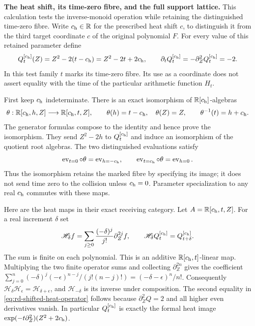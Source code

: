\documentclass[11pt,a4paper]{article}
\theoremstyle{definition}\newtheorem{definition}[theorem]{Definition}
\begin{document}
\RD\textbf{The heat shift, its time-zero fibre, and the full support lattice.}
This calculation tests the inverse-monoid operation while retaining
the distinguished time-zero fibre. Write $c_{\rm h}\in\mathbb R$
for the prescribed heat shift $c$, to distinguish it from the third
target coordinate $c$ of the original polynomial $F$. For every
value of this retained parameter define
\begin{equation}
 Q_t^{[c_{\rm h}]}(Z)=Z^2-2(t-c_{\rm h})
 =Z^2-2t+2c_{\rm h},\qquad
 \partial_tQ_t^{[c_{\rm h}]}=-\partial_Z^2Q_t^{[c_{\rm h}]}=-2.
 \label{eq:rd-shifted-heat}
\end{equation}
In this test family $t$ marks its time-zero fibre. Its use as a
coordinate does not assert equality with the time of the particular
arithmetic function $H_t$.

First keep $c_{\rm h}$ indeterminate. There is an exact isomorphism
of $\mathbb R[c_{\rm h}]$-algebras
\begin{equation}
 \theta:\mathbb R[c_{\rm h},h,Z]\longrightarrow
              \mathbb R[c_{\rm h},t,Z],\qquad
 \theta(h)=t-c_{\rm h},\quad\theta(Z)=Z,
 \qquad \theta^{-1}(t)=h+c_{\rm h}.
 \label{eq:rd-shifted-coordinate-map}
\end{equation}
The generator formulas compose to the identity and hence prove the
isomorphism. They send $Z^2-2h$ to
$Q_t^{[c_{\rm h}]}$ and induce an isomorphism of the quotient root
algebras. The two distinguished evaluations satisfy
\begin{equation}
 \operatorname{ev}_{t=0}\circ\theta
   =\operatorname{ev}_{h=-c_{\rm h}},\qquad
 \operatorname{ev}_{t=c_{\rm h}}\circ\theta
   =\operatorname{ev}_{h=0}.
 \label{eq:rd-shifted-marked-fibres}
\end{equation}
Thus the isomorphism retains the marked fibre by specifying its
image; it does not send time zero to the collision unless
$c_{\rm h}=0$. Parameter specialization to any real $c_{\rm h}$
commutes with these maps.

Here are the heat maps in their exact receiving category. Let
$A=\mathbb R[c_{\rm h},t,Z]$. For a real increment $\delta$ set
\begin{equation}
 \mathscr H_\delta f
   =\sum_{j\ge0}\frac{(-\delta)^j}{j!}\partial_Z^{2j}f,
 \qquad
 \mathscr H_\delta Q_t^{[c_{\rm h}]}
   =Q_{t+\delta}^{[c_{\rm h}]}.
 \label{eq:rd-shifted-heat-operator}
\end{equation}
The sum is finite on each polynomial. This is an additive
$\mathbb R[c_{\rm h},t]$-linear map. Multiplying the two finite
operator sums and collecting $\partial_Z^{2n}$ gives the coefficient
$\sum_{j=0}^n(-\delta)^j(-\epsilon)^{n-j}/(j!(n-j)!)
=(-\delta-\epsilon)^n/n!$. Consequently
$\mathscr H_\delta\mathscr H_\epsilon
=\mathscr H_{\delta+\epsilon}$, and
$\mathscr H_{-\delta}$ is its inverse under composition.
The second equality in \eqref{eq:rd-shifted-heat-operator} follows
because $\partial_Z^2Q=2$ and all higher even derivatives vanish.
In particular $Q_t^{[c_{\rm h}]}$ is exactly the formal heat image
$\exp(-t\partial_Z^2)(Z^2+2c_{\rm h})$.
\end{document}
